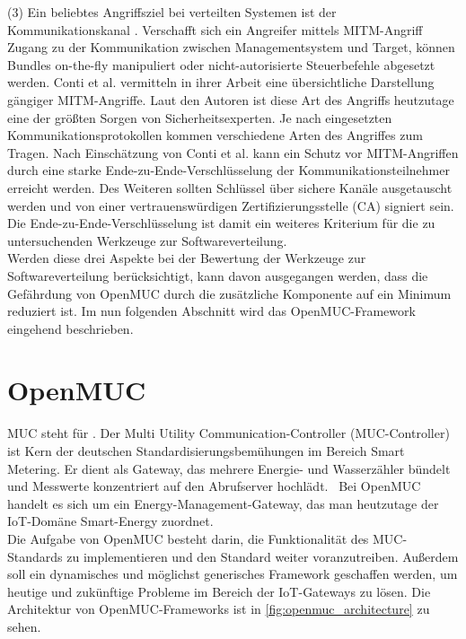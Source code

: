 (3) Ein beliebtes Angriffsziel bei verteilten Systemen ist der Kommunikationskanal \cite{iot_security_issues}.
Verschafft sich ein Angreifer mittels \ac{MITM}-Angriff Zugang zu der Kommunikation 
zwischen Managementsystem und Target, können Bundles on-the-fly manipuliert oder nicht-autorisierte Steuerbefehle abgesetzt werden.
Conti et al. \cite{man_middle} vermitteln in ihrer Arbeit eine übersichtliche Darstellung gängiger \ac{MITM}-Angriffe.
Laut den Autoren ist diese Art des Angriffs heutzutage eine der größten Sorgen von Sicherheitsexperten. Je nach eingesetzten Kommunikationsprotokollen kommen verschiedene Arten des Angriffes
zum Tragen. Nach Einschätzung von Conti et al. \cite{man_middle} kann ein Schutz vor \ac{MITM}-Angriffen durch eine starke Ende-zu-Ende-Verschlüsselung der Kommunikationsteilnehmer
erreicht werden. Des Weiteren sollten Schlüssel über sichere Kanäle ausgetauscht werden und von einer vertrauenswürdigen Zertifizierungsstelle (\ac{CA}) signiert sein.
Die Ende-zu-Ende-Verschlüsselung ist damit ein weiteres Kriterium für die zu untersuchenden Werkzeuge zur Softwareverteilung.\\

Werden diese drei Aspekte bei der Bewertung der Werkzeuge zur Softwareverteilung berücksichtigt, kann davon ausgegangen werden,
dass die Gefährdung von OpenMUC durch die zusätzliche Komponente auf ein Minimum reduziert ist. Im nun folgenden Abschnitt wird das OpenMUC-Framework eingehend beschrieben.

\section{OpenMUC}
\acs{MUC} steht für . 
\glqq Der Multi Utility Communication-Con\-troller  (MUC-Controller) ist Kern der deutschen Standardisierungsbemühungen  
im Bereich Smart Metering. Er dient als Gateway, das mehrere Energie- und Wasserzähler bündelt und Messwerte konzentriert
auf den Abrufserver hochlädt.\grqq\ \cite{ise_muc}
Bei OpenMUC handelt es sich um ein Energy-Management-Gateway, das man heutzutage der \ac{IoT}-Domäne Smart-Energy zuordnet.\\

Die Aufgabe von OpenMUC besteht darin, die Funktionalität des MUC-Standards zu implementieren und den Standard weiter voranzutreiben.
Außerdem soll ein dynamisches und möglichst generisches Framework geschaffen werden, um heutige und zukünftige Probleme im Bereich der \ac{IoT}-Gateways zu lösen.
Die Architektur von OpenMUC-Frameworks ist in \autoref{fig:openmuc_architecture} zu sehen. 

